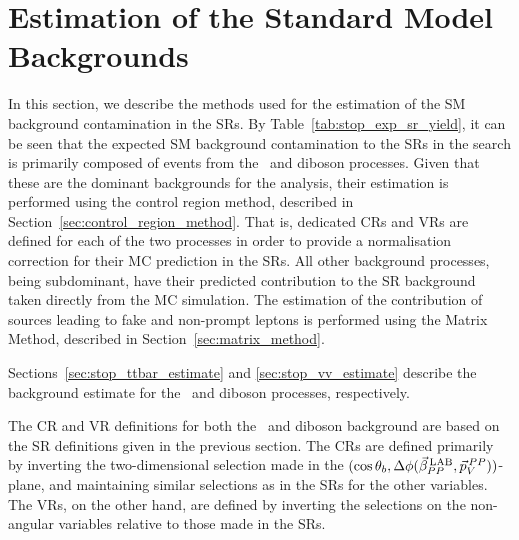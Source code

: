 \section{Estimation of the Standard Model Backgrounds}
\label{sec:stop_background_estimate}

In this section, we describe the methods used for the estimation of the SM background
contamination in the SRs.
By Table~\ref{tab:stop_exp_sr_yield}, it can be seen that the expected SM background
contamination to the SRs in the \bWN search is primarily composed of events
from the \ttbar~and diboson processes.
Given that these are the dominant backgrounds for the analysis, their estimation is performed
using the control region method, described in Section~\ref{sec:control_region_method}.
That is, dedicated CRs and VRs are defined for each of the two processes in order
to provide a normalisation correction for their MC prediction in the SRs.
All other background processes, being subdominant, have their predicted contribution
to the SR background taken directly from the MC simulation.
The estimation of the contribution of sources leading to fake and non-prompt leptons
is performed using the Matrix Method, described in Section~\ref{sec:matrix_method}.

Sections~\ref{sec:stop_ttbar_estimate} and \ref{sec:stop_vv_estimate} describe
the background estimate for the \ttbar~and diboson processes, respectively.

The CR and VR definitions for both the \ttbar~and diboson background are based on the
SR definitions given in the previous section.
The CRs are defined primarily by inverting the two-dimensional selection
made in the $(\cos\theta_b, \Delta \phi (\vec{\beta}_{PP}^{\,\text{LAB}}, \vec{p}_V^{\,PP}))$-plane, and maintaining similar selections as in the SRs for the other variables.
The VRs, on the other hand, are defined by inverting the selections on the non-angular variables relative to those
made in the SRs.

